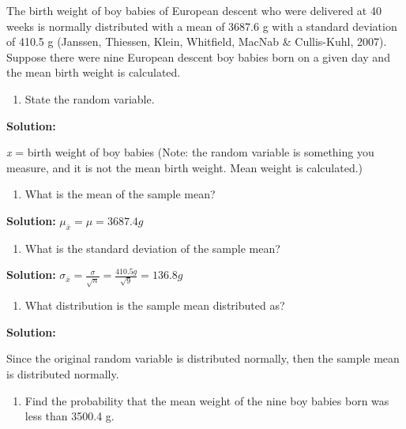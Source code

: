 \documentclass[
]{book}
\providecommand{\tightlist}{%
  \setlength{\itemsep}{0pt}\setlength{\parskip}{0pt}}
\begin{document}
The birth weight of boy babies of European descent who were delivered at 40 weeks is normally distributed with a mean of 3687.6 g with a standard deviation of 410.5 g (Janssen, Thiessen, Klein, Whitfield, MacNab \& Cullis-Kuhl, 2007). Suppose there were nine European descent boy babies born on a given day and the mean birth weight is calculated.

\begin{enumerate}
\def\labelenumi{\alph{enumi}.}
\tightlist
\item
  State the random variable.
\end{enumerate}

\textbf{Solution:}

\emph{x} = birth weight of boy babies (Note: the random variable is something you measure, and it is not the mean birth weight. Mean weight is calculated.)

\begin{enumerate}
\def\labelenumi{\alph{enumi}.}
\setcounter{enumi}{1}
\tightlist
\item
  What is the mean of the sample mean?
\end{enumerate}

\textbf{Solution:}
\(\mu_{\bar{x}}=\mu=3687.4g\)

\begin{enumerate}
\def\labelenumi{\alph{enumi}.}
\setcounter{enumi}{2}
\tightlist
\item
  What is the standard deviation of the sample mean?
\end{enumerate}

\textbf{Solution:}
\(\sigma_{\bar{x}}=\frac{\sigma}{\sqrt{n}}=\frac{410.5g}{\sqrt{9}}=136.8g\)

\begin{enumerate}
\def\labelenumi{\alph{enumi}.}
\setcounter{enumi}{3}
\tightlist
\item
  What distribution is the sample mean distributed as?
\end{enumerate}

\textbf{Solution:}

Since the original random variable is distributed normally, then the sample mean is distributed normally.

\begin{enumerate}
\def\labelenumi{\alph{enumi}.}
\setcounter{enumi}{4}
\tightlist
\item
  Find the probability that the mean weight of the nine boy babies born was less than 3500.4 g.
\end{enumerate}
\end{document}
